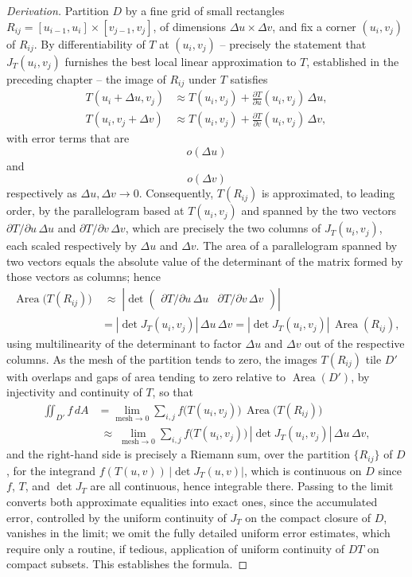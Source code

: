 \begin{proof}[Derivation]
Partition $D$ by a fine grid of small rectangles $R_{ij} = [u_{i-1},u_i]\times[v_{j-1},v_j]$, of dimensions $\Delta u \times \Delta v$, and fix a corner $(u_i,v_j)$ of $R_{ij}$. By differentiability of $T$ at $(u_i,v_j)$ -- precisely the statement that $J_T(u_i,v_j)$ furnishes the best local linear approximation to $T$, established in the preceding chapter -- the image of $R_{ij}$ under $T$ satisfies
\begin{align*}
T(u_i + \Delta u, v_j) &\approx T(u_i,v_j) + \frac{\partial T}{\partial u}(u_i,v_j)\,\Delta u, \\
T(u_i, v_j+\Delta v) &\approx T(u_i,v_j) + \frac{\partial T}{\partial v}(u_i,v_j)\, \Delta v,
\end{align*}
with error terms that are
\[
o(\Delta u)
\]
 and
\[
o(\Delta v)
\]
 respectively as $\Delta u, \Delta v \to 0$. Consequently, $T(R_{ij})$ is approximated, to leading order, by the parallelogram based at $T(u_i,v_j)$ and spanned by the two vectors $\partial T/\partial u\, \Delta u$ and $\partial T/\partial v\, \Delta v$, which are precisely the two columns of $J_T(u_i,v_j)$, each scaled respectively by $\Delta u$ and $\Delta v$. The area of a parallelogram spanned by two vectors equals the absolute value of the determinant of the matrix formed by those vectors as columns; hence
\begin{align*}
\operatorname{Area}\big(T(R_{ij})\big) &\;\approx\; \left| \det \begin{pmatrix} \partial T/\partial u \, \Delta u & \partial T/\partial v \, \Delta v \end{pmatrix} \right| \\
&= |\det J_T(u_i,v_j)| \, \Delta u\, \Delta v = |\det J_T(u_i,v_j)|\, \operatorname{Area}(R_{ij}),
\end{align*}
using multilinearity of the determinant to factor $\Delta u$ and $\Delta v$ out of the respective columns. As the mesh of the partition tends to zero, the images $T(R_{ij})$ tile $D'$ with overlaps and gaps of area tending to zero relative to $\operatorname{Area}(D')$, by injectivity and continuity of $T$, so that
\begin{align*}
\iint_{D'} f\, dA &= \lim_{\text{mesh}\to 0} \sum_{i,j} f\big(T(u_i,v_j)\big)\, \operatorname{Area}\big(T(R_{ij})\big) \\
&\;\approx\; \lim_{\text{mesh}\to 0} \sum_{i,j} f\big(T(u_i,v_j)\big)\, |\det J_T(u_i,v_j)|\, \Delta u \, \Delta v,
\end{align*}
and the right-hand side is precisely a Riemann sum, over the partition $\{R_{ij}\}$ of $D$, for the integrand $f(T(u,v))\,|\det J_T(u,v)|$, which is continuous on $D$ since $f$, $T$, and $\det J_T$ are all continuous, hence integrable there. Passing to the limit converts both approximate equalities into exact ones, since the accumulated error, controlled by the uniform continuity of $J_T$ on the compact closure of $D$, vanishes in the limit; we omit the fully detailed uniform error estimates, which require only a routine, if tedious, application of uniform continuity of $DT$ on compact subsets. This establishes the formula.
\end{proof}

